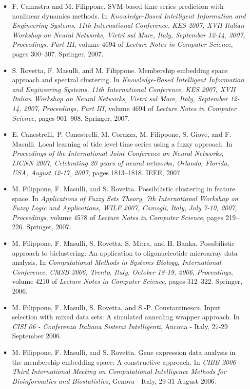\begin{itemize}
\item  F. Camastra and M. Filippone. SVM-based time series prediction with nonlinear dynamics methods. In \emph{Knowledge-Based Intelligent Information and Engineering Systems, 11th International Conference, KES 2007, XVII Italian Workshop on Neural Networks, Vietri sul Mare, Italy, September 12-14, 2007, Proceedings, Part III}, volume 4694 of \emph{Lecture Notes in Computer Science}, pages 300--307. Springer, 2007.  
\item  S. Rovetta, F. Masulli, and M. Filippone. Membership embedding space approach and spectral clustering. In \emph{Knowledge-Based Intelligent Information and Engineering Systems, 11th International Conference, KES 2007, XVII Italian Workshop on Neural Networks, Vietri sul Mare, Italy, September 12-14, 2007, Proceedings, Part III}, volume 4694 of \emph{Lecture Notes in Computer Science}, pages 901--908. Springer, 2007.  
\item  E. Canestrelli, P. Canestrelli, M. Corazza, M. Filippone, S. Giove, and F. Masulli. Local learning of tide level time series using a fuzzy approach. In \emph{Proceedings of the International Joint Conference on Neural Networks, IJCNN 2007, Celebrating 20 years of neural networks, Orlando, Florida, USA, August 12-17, 2007}, pages 1813--1818. IEEE, 2007.  
\item  M. Filippone, F. Masulli, and S. Rovetta. Possibilistic clustering in feature space. In \emph{Applications of Fuzzy Sets Theory, 7th International Workshop on Fuzzy Logic and Applications, WILF 2007, Camogli, Italy, July 7-10, 2007, Proceedings}, volume 4578 of \emph{Lecture Notes in Computer Science}, pages 219--226. Springer, 2007.  
\item  M. Filippone, F. Masulli, S. Rovetta, S. Mitra, and H. Banka. Possibilistic approach to biclustering: An application to oligonucleotide microarray data analysis. In \emph{Computational Methods in Systems Biology, International Conference, CMSB 2006, Trento, Italy, October 18-19, 2006, Proceedings}, volume 4210 of \emph{Lecture Notes in Computer Science}, pages 312--322. Springer, 2006.  
\item  M. Filippone, F. Masulli, S. Rovetta, and S.-P. Constantinescu. Input selection with mixed data sets: A simulated annealing wrapper approach. In \emph{CISI 06 - Conferenza Italiana Sistemi Intelligenti}, Ancona - Italy, 27-29 September 2006.  
\item  M. Filippone, F. Masulli, and S. Rovetta. Gene expression data analysis in the membership embedding space: A constructive approach. In \emph{CIBB 2006 - Third International Meeting on Computational Intelligence Methods for Bioinformatics and Biostatistics}, Genova - Italy, 29-31 August 2006.  

\end{itemize}
